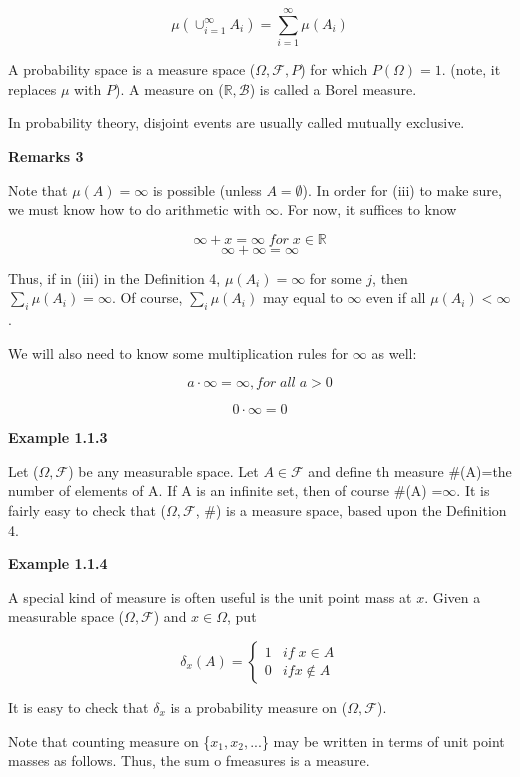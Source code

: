 \documentclass[
]{book}
\begin{document}
\[\mu(\cup_{i=1}^\infty A_i)=\sum_{i=1}^\infty \mu(A_i)\]

A probability space is a measure space (\(\Omega, \mathcal{F}, P\)) for which \(P(\Omega)=1\). (note, it replaces \(\mu\) with \(P\)). A measure on (\(\mathbb{R}, \mathcal{B}\)) is called a Borel measure.

In probability theory, disjoint events are usually called mutually exclusive.

\textbf{Remarks 3}

Note that \(\mu(A)=\infty\) is possible (unless \(A=\emptyset\)). In order for (iii) to make sure, we must know how to do arithmetic with \(\infty\). For now, it suffices to know

\[\infty+x=\infty \; for \; x \in \mathbb{R}\]
\[\infty+\infty=\infty\]

Thus, if in (iii) in the Definition 4, \(\mu(A_i)=\infty\) for some \(j\), then \(\sum_i \mu(A_i)=\infty\). Of course, \(\sum_i \mu(A_i)\) may equal to \(\infty\) even if all \(\mu(A_i) < \infty\).

We will also need to know some multiplication rules for \(\infty\) as well:

\[a \cdot \infty=\infty, for \; all \; a>0\]

\[0 \cdot \infty = 0\]

\textbf{Example 1.1.3}

Let (\(\Omega, \mathcal{F}\)) be any measurable space. Let \(A \in \mathcal {F}\) and define th measure \#(A)=the number of elements of A. If A is an infinite set, then of course \#(A) =\(\infty\). It is fairly easy to check that (\(\Omega, \mathcal{F}\), \#) is a measure space, based upon the Definition 4.

\textbf{Example 1.1.4}

A special kind of measure is often useful is the unit point mass at \(x\). Given a measurable space (\(\Omega, \mathcal{F}\)) and \(x \in \Omega\), put

\[\delta_x(A)=\begin{cases} 1 & if \; x \in  A \\ 0 & if x  \notin  A \end{cases}\]

It is easy to check that \(\delta_x\) is a probability measure on (\(\Omega, \mathcal{F}\)).

Note that counting measure on \{\(x_1, x_2,...\)\} may be written in terms of unit point masses as follows. Thus, the sum o fmeasures is a measure.
\end{document}

